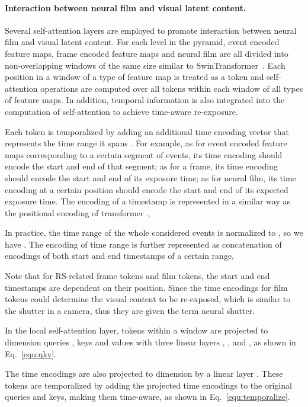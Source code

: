 \documentclass[10pt,twocolumn,letterpaper]{article}
\begin{document}
\paragraph{Interaction between neural film and visual latent content.} 
Several self-attention layers are employed to promote interaction between neural film and visual latent content.
For each level in the pyramid, event encoded feature maps, frame encoded feature maps and neural film are all divided into non-overlapping windows of the same size  similar to SwinTransformer~\cite{SwinTransformer}.
Each position in a window of a type of feature map is treated as a token and self-attention operations are computed over all tokens within each window of all types of feature maps.
In addition, temporal information is also integrated into the computation of self-attention to achieve time-aware re-exposure.

Each token is temporalized by adding an additional time encoding vector that represents the time range it spans .
For example, as for event encoded feature maps corresponding to a certain segment of events, its time encoding should encode the start and end of that segment; as for a frame, its time encoding should encode the start and end of its exposure time; as for neural film, its time encoding at a certain position should encode the start and end of its expected exposure time. 
The encoding of a timestamp is represented in a similar way as the positional encoding of transformer~\cite{Transformer},

In practice, the time range of the whole considered events  is normalized to , so we have .
The encoding of time range is further represented as concatenation of encodings of both start and end timestamps of a certain range, 
 
Note that for RS-related frame tokens and film tokens, the start and end timestamps are dependent on their position.
Since the time encodings for film tokens could determine the visual content to be re-exposed, which is similar to the shutter in a camera, thus they are given the term neural shutter.

In the local self-attention layer, tokens within a window are projected to dimension queries , keys  and values  with three linear layers , , and , as shown in Eq.~\ref{equ:qkv}.

The time encodings are also projected to dimension  by a linear layer .
These tokens are temporalized by adding the projected time encodings to the original queries and keys, making them time-aware, as shown in Eq.~\ref{equ:temporalize}.
\end{document}
